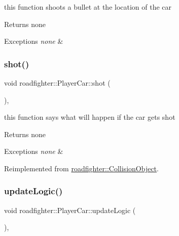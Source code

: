 this function shoots a bullet at the location of the car \begin{DoxyReturn}{Returns}
none 
\end{DoxyReturn}

\begin{DoxyExceptions}{Exceptions}
{\em none} & \\
\hline
\end{DoxyExceptions}
\mbox{\label{classroadfighter_1_1PlayerCar_a592556a1c6326c9d9a70691f036eaafc}} 
\subsubsection{\texorpdfstring{shot()}{shot()}}
{\footnotesize\ttfamily void roadfighter\+::\+Player\+Car\+::shot (\begin{DoxyParamCaption}{ }\end{DoxyParamCaption})\hspace{0.3cm}{\ttfamily [override]}, {\ttfamily [virtual]}}

this function says what will happen if the car gets shot \begin{DoxyReturn}{Returns}
none 
\end{DoxyReturn}

\begin{DoxyExceptions}{Exceptions}
{\em none} & \\
\hline
\end{DoxyExceptions}


Reimplemented from \hyperlink{classroadfighter_1_1CollisionObject_a55d891b6d9b50abdc44f964a40a7777c}{roadfighter\+::\+Collision\+Object}.

\mbox{\label{classroadfighter_1_1PlayerCar_a01480487ca7978a50a3c6609f1ebe6df}} 
\subsubsection{\texorpdfstring{update\+Logic()}{updateLogic()}}
{\footnotesize\ttfamily void roadfighter\+::\+Player\+Car\+::update\+Logic (\begin{DoxyParamCaption}{ }\end{DoxyParamCaption})\hspace{0.3cm}{\ttfamily [override]}, {\ttfamily [virtual]}}

